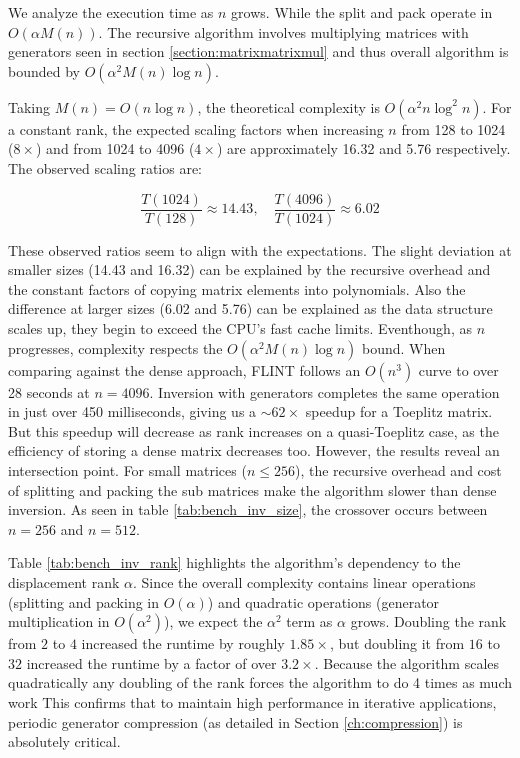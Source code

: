 We analyze the execution time as $n$ grows.
While the split and pack
operate in $O(\alpha M(n))$. The recursive
algorithm involves multiplying matrices with generators seen in
section \ref{section:matrixmatrixmul} and thus
overall algorithm is bounded by $O(\alpha^2 M(n) \log n)$.

Taking $M(n) = O(n \log n)$, the theoretical
complexity is $O(\alpha^2 n \log^2 n)$. For a
constant rank, the expected scaling factors when increasing $n$ from
128 to 1024 ($8\times$) and from 1024 to 4096 ($4\times$) are
approximately 16.32 and 5.76 respectively. The
observed scaling ratios are:

$$ \frac{T(1024)}{T(128)} \approx 14.43, \quad
\frac{T(4096)}{T(1024)} \approx 6.02 $$

These observed ratios seem to align with the
expectations.
The slight deviation at smaller sizes (14.43 and 16.32)
can be explained by the recursive overhead and the constant factors
of copying matrix elements into polynomials. Also the difference at larger
sizes (6.02 and 5.76) can be explained as the data structure
scales up, they begin to exceed the CPU's fast cache limits.
Eventhough, as $n$ progresses, complexity respects the
$O(\alpha^2 M(n) \log n)$ bound.
When comparing against the dense approach, FLINT follows an
$O(n^3)$ curve to over 28 seconds at $n=4096$.
Inversion with generators completes the same operation in just over
450 milliseconds, giving us a $\sim \! 62\times$ speedup for a
Toeplitz matrix.
But this speedup will decrease as rank increases on a quasi-Toeplitz
case, as the efficiency of storing a dense matrix decreases too.
However, the results reveal an intersection point. For
small matrices ($n \le 256$), the recursive overhead and cost of
splitting and packing the sub matrices make the algorithm
slower than dense inversion. As seen in table
\ref{tab:bench_inv_size}, the crossover occurs between $n=256$ and $n=512$.

Table \ref{tab:bench_inv_rank} highlights the algorithm's dependency
to the displacement rank $\alpha$. Since the overall complexity
contains linear operations (splitting and
packing in $O(\alpha)$) and quadratic operations (generator
multiplication in $O(\alpha^2)$), we expect the $\alpha^2$ term as
$\alpha$ grows.
Doubling the rank from $2$ to $4$ increased the runtime by roughly
$1.85\times$, but doubling it from $16$ to $32$ increased the runtime
by a factor of over $3.2\times$. Because the algorithm scales quadratically
any doubling of the rank forces the algorithm to do 4 times as much work
This confirms that to maintain high
performance in iterative applications, periodic generator compression
(as detailed in Section \ref{ch:compression}) is absolutely critical.

